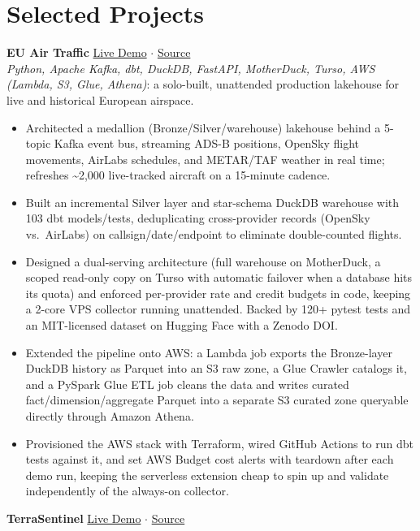 \documentclass[10.5pt,letterpaper]{article}
\begin{document}
\section*{Selected Projects}
\textbf{EU Air Traffic} \hfill \href{https://airtraffic.eu.cc/}{Live Demo} $\cdot$ \href{https://github.com/swadhinbiswas/eu-air-traffic}{Source} \\
\textit{Python, Apache Kafka, dbt, DuckDB, FastAPI, MotherDuck, Turso, AWS (Lambda, S3, Glue, Athena)}: a solo-built, unattended production lakehouse for live and historical European airspace.
\begin{itemize}
  \item Architected a medallion (Bronze/Silver/warehouse) lakehouse behind a 5-topic Kafka event bus, streaming ADS-B positions, OpenSky flight movements, AirLabs schedules, and METAR/TAF weather in real time; refreshes \textasciitilde2,000 live-tracked aircraft on a 15-minute cadence.
  \item Built an incremental Silver layer and star-schema DuckDB warehouse with 103 dbt models/tests, deduplicating cross-provider records (OpenSky vs.\ AirLabs) on callsign/date/endpoint to eliminate double-counted flights.
  \item Designed a dual-serving architecture (full warehouse on MotherDuck, a scoped read-only copy on Turso with automatic failover when a database hits its quota) and enforced per-provider rate and credit budgets in code, keeping a 2-core VPS collector running unattended. Backed by 120+ pytest tests and an MIT-licensed dataset on Hugging Face with a Zenodo DOI.
  \item Extended the pipeline onto AWS: a Lambda job exports the Bronze-layer DuckDB history as Parquet into an S3 raw zone, a Glue Crawler catalogs it, and a PySpark Glue ETL job cleans the data and writes curated fact/dimension/aggregate Parquet into a separate S3 curated zone queryable directly through Amazon Athena.
  \item Provisioned the AWS stack with Terraform, wired GitHub Actions to run dbt tests against it, and set AWS Budget cost alerts with teardown after each demo run, keeping the serverless extension cheap to spin up and validate independently of the always-on collector.
\end{itemize}
\vspace{2pt}
\textbf{TerraSentinel} \hfill \href{https://terrasentinel-dashboard.pages.dev}{Live Demo} $\cdot$ \href{https://github.com/swadhinbiswas/TerraSentinel}{Source} \\
\end{document}
